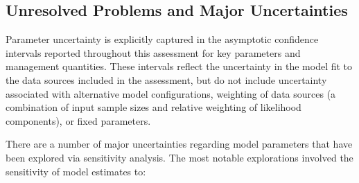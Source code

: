 \documentclass[12pt,]{article}
\begin{document}
\FloatBarrier

\subsection*{Unresolved Problems and Major
Uncertainties}\label{unresolved-problems-and-major-uncertainties}

Parameter uncertainty is explicitly captured in the asymptotic
confidence intervals reported throughout this assessment for key
parameters and management quantities. These intervals reflect the
uncertainty in the model fit to the data sources included in the
assessment, but do not include uncertainty associated with alternative
model configurations, weighting of data sources (a combination of input
sample sizes and relative weighting of likelihood components), or fixed
parameters.

There are a number of major uncertainties regarding model parameters
that have been explored via sensitivity analysis. The most notable
explorations involved the sensitivity of model estimates to:
\end{document}
